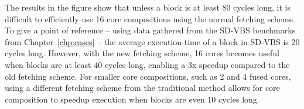 The results in the figure show that unless a block is at least 80 cycles long, it is difficult to efficiently use 16 core compositions using the normal fetching scheme.
To give a point of reference -- using data gathered from the SD-VBS benchmarks from Chapter~\ref{chp:cases} -- the average execution time of a block in SD-VBS is 20 cycles long.
However, with the new fetching scheme, 16 cores becomes useful when blocks are at least 40 cycles long, enabling a 3x speedup compared to the old fetching scheme.
For smaller core compositions, such as 2 and 4 fused cores, using a different fetching scheme from the traditional method allows for core composition to speedup execution when blocks are even 10 cycles long.
